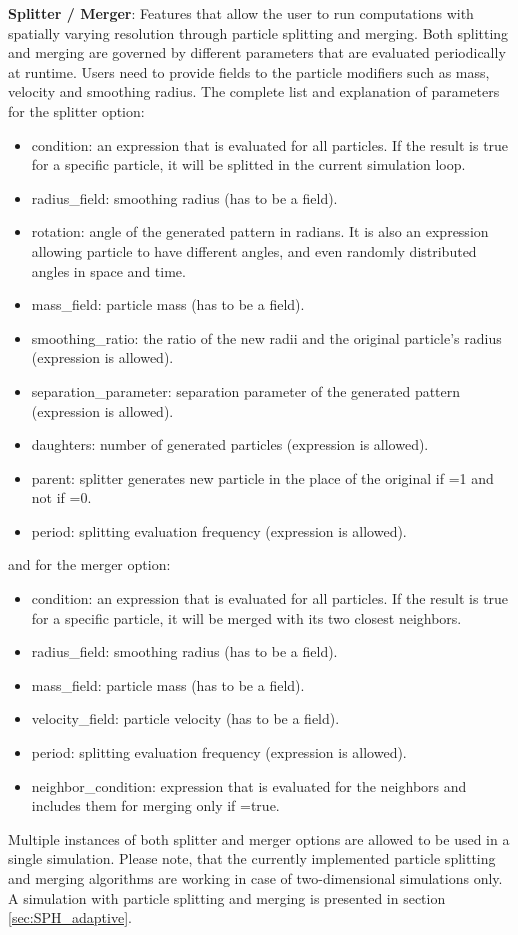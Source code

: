 \documentclass[a4paper,12pt,openany]{book}
\theoremstyle{break}
\begin{document}
\textbf{Splitter / Merger}: Features that allow the user to run computations with spatially varying resolution through particle splitting and merging. Both splitting and merging are governed by different parameters that are evaluated periodically at runtime. Users need to provide fields to the particle modifiers such as mass, velocity and smoothing radius. The complete list and explanation of parameters for the splitter option:
\begin{itemize}
  \item condition: an expression that is evaluated for all particles. If the result is true for a specific particle, it will be splitted in the current simulation loop.
  \item radius\_field: smoothing radius (has to be a field).
  \item rotation: angle of the generated pattern in radians. It is also an expression allowing particle to have different angles, and even randomly distributed angles in space and time.
  \item mass\_field: particle mass (has to be a field).
  \item smoothing\_ratio: the ratio of the new radii and the original particle's radius (expression is allowed).
  \item separation\_parameter: separation parameter of the generated pattern (expression is allowed).
  \item daughters: number of generated particles (expression is allowed).
  \item parent: splitter generates new particle in the place of the original if =1 and not if =0.
  \item period: splitting evaluation frequency (expression is allowed).
\end{itemize}
and for the merger option:
\begin{itemize}
  \item condition: an expression that is evaluated for all particles. If the result is true for a specific particle, it will be merged with its two closest neighbors.
  \item radius\_field: smoothing radius (has to be a field).
  \item mass\_field: particle mass (has to be a field).
  \item velocity\_field: particle velocity (has to be a field).
  \item period: splitting evaluation frequency (expression is allowed).
  \item neighbor\_condition: expression that is evaluated for the neighbors and includes them for merging only if =true.
\end{itemize}
Multiple instances of both splitter and merger options are allowed to be used in a single simulation. Please note, that the currently implemented particle splitting and merging algorithms are working in case of two-dimensional simulations only. A simulation with particle splitting and merging is presented in section \ref{sec:SPH_adaptive}.
\end{document}
